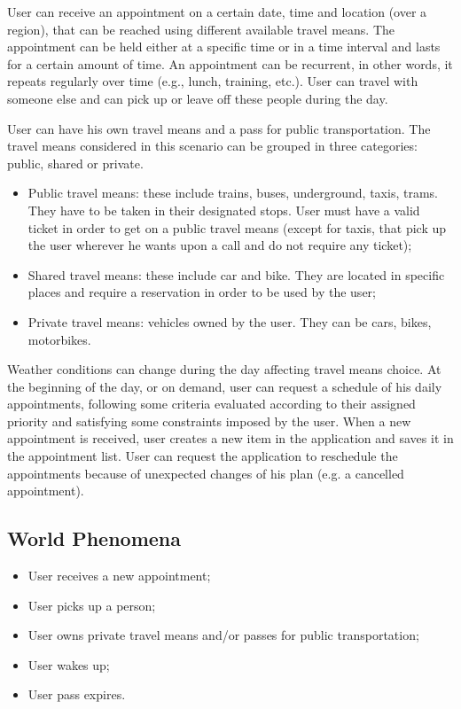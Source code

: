 User can receive an appointment on a certain date, time and location (over a region), that can be reached using different available travel means. The appointment can be held either at a specific time or in a time interval and lasts for a certain amount of time. An appointment can be recurrent, in other words, it repeats regularly over time (e.g., lunch, training, etc.). User can travel with someone else and can pick up or leave off these people during the day.

User can have his own travel means and a pass for public transportation. 
The travel means considered in this scenario can be grouped in three categories: public, shared or private.
\begin{itemize}
\item Public travel means: these include trains, buses, underground, taxis, trams. They have to be taken in their designated stops. User must have a valid ticket in order to get on a public travel means (except for taxis, that pick up the user wherever he wants upon a call and do not require any ticket); 
\item Shared travel means: these include car and bike. They are located in specific places and require a reservation in order to be used by the user;
\item Private travel means: vehicles owned by the user. They can be cars, bikes, motorbikes.
\end{itemize}

Weather conditions can change during the day affecting travel means choice.
At the beginning of the day, or on demand, user can request a schedule of his daily appointments, following some criteria evaluated according to their assigned priority and satisfying some constraints imposed by the user.
When a new appointment is received, user creates a new item in the application and saves it in the appointment list. User can request the application to reschedule the appointments because of unexpected changes of his plan (e.g. a cancelled appointment).

\subsection{World Phenomena}
\begin{itemize}
\item User receives a new appointment;
\item User picks up a person;
\item User owns private travel means and/or passes for public transportation;
\item User wakes up;
\item User pass expires.
\end{itemize}

